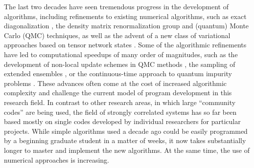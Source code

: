 \documentclass[12pt]{iopart}
\begin{document}
The last two decades have seen tremendous progress in the development of
algorithms, including refinements to existing numerical algorithms, such as exact diagonalization \cite{lanczos},
the density matrix renormalization group \cite{White1992,Schollwock2005,Daley2004,White2004} and (quantum) 
Monte Carlo (QMC) techniques, as well as the advent of a new class of variational approaches based on 
tensor network states \cite{vidal1,vidal2,Verstraete04,Murg07,vidal07}. 
Some of the algorithmic refinements have led to computational speedups of many order of magnitudes, such as 
the development of non-local update schemes \cite{Swendsen87} in QMC methods \cite{Prokofev98A,Todo01,looper,Sylyuasen,Alet2005}, 
the sampling of extended ensembles \cite{Wang01,Wang01b,Troyer03,Trebst04,Katzgraber06,Wessel07},
or the continuous-time approach to quantum impurity problems \cite{Evertz03,Rubtsov04,Rubtsov05,Werner06,Werner06Kondo, Gull08_ctaux}.
These advances often come at the cost of increased algorithmic
complexity and challenge the current model of program development in
this research field. In contrast to other research areas, in which
large ``community codes'' are being used, the field of strongly
correlated systems has so far been based mostly on single codes developed by
individual researchers for particular projects. While simple
algorithms used a decade ago could be easily programmed by a beginning
graduate student in a matter of weeks, it now takes substantially
longer to master and implement the new algorithms. At the same time, the use of numerical approaches is increasing. 
\end{document}
